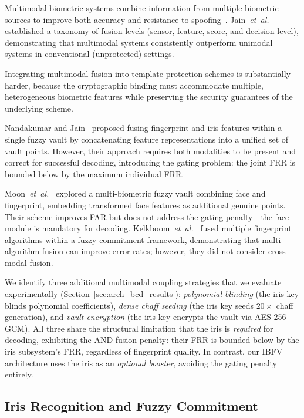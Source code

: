 \documentclass[3p,twocolumn]{elsarticle}
\newcommand{\IBFV}{\textsf{IBFV}}
\begin{document}
Multimodal biometric systems combine information from multiple biometric sources to improve both accuracy and resistance to spoofing~\cite{ross2003information}. Jain~\textit{et~al.}~\cite{jain2004multibiometrics} established a taxonomy of fusion levels (sensor, feature, score, and decision level), demonstrating that multimodal systems consistently outperform unimodal systems in conventional (unprotected) settings.

Integrating multimodal fusion into template protection schemes is substantially harder, because the cryptographic binding must accommodate multiple, heterogeneous biometric features while preserving the security guarantees of the underlying scheme.

Nandakumar and Jain~\cite{nandakumar2008multibiometric} proposed fusing fingerprint and iris features within a single fuzzy vault by concatenating feature representations into a unified set of vault points. However, their approach requires both modalities to be present and correct for successful decoding, introducing the gating problem: the joint FRR is bounded below by the maximum individual FRR.

Moon~\textit{et~al.}~\cite{moon2010multibiometric} explored a multi-biometric fuzzy vault combining face and fingerprint, embedding transformed face features as additional genuine points. Their scheme improves FAR but does not address the gating penalty---the face module is mandatory for decoding. Kelkboom~\textit{et~al.}~\cite{kelkboom2011multialgorithm} fused multiple fingerprint algorithms within a fuzzy commitment framework, demonstrating that multi-algorithm fusion can improve error rates; however, they did not consider cross-modal fusion.

We identify three additional multimodal coupling strategies that we evaluate experimentally (Section~\ref{sec:arch_bcd_results}): \emph{polynomial blinding} (the iris key blinds polynomial coefficients), \emph{dense chaff seeding} (the iris key seeds $20\times$ chaff generation), and \emph{vault encryption} (the iris key encrypts the vault via AES-256-GCM). All three share the structural limitation that the iris is \emph{required} for decoding, exhibiting the AND-fusion penalty: their FRR is bounded below by the iris subsystem's FRR, regardless of fingerprint quality. In contrast, our \IBFV{} architecture uses the iris as an \emph{optional booster}, avoiding the gating penalty entirely.

\subsection{Iris Recognition and Fuzzy Commitment}
\end{document}

